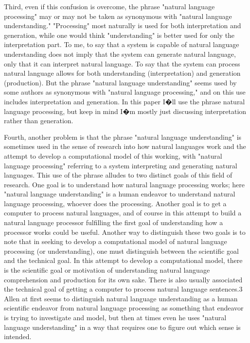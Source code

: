 Third, even if this confusion is overcome, the phrase "natural language processing" may or may not be taken as synonymous with "natural language understanding." "Processing" most naturally is used for both interpretation and generation, while one would think "understanding" is better used for only the interpretation part. To me, to say that a system is capable of natural language understanding does not imply that the system can generate natural language, only that it can interpret natural language. To say that the system can process natural language allows for both understanding (interpretation) and generation (production). But the phrase "natural language understanding" seems used by some authors as synonymous with "natural language processing," and on this use includes interpretation and generation. In this paper I�ll use the phrase natural language processing, but keep in mind I�m mostly just discussing interpretation rather than generation.

Fourth, another problem is that the phrase "natural language understanding" is sometimes used in the sense of research into how natural languages work and the attempt to develop a computational model of this working, with "natural language processing" referring to a system interpreting and generating natural languages. This use of the phrase alludes to two distinct goals of this field of research. One goal is to understand how natural language processing works; here "natural language understanding" is a human endeavor to understand natural language processing, whoever does the processing. Another goal is to get a computer to process natural languages, and of course in this attempt to build a natural language processor fulfilling the first goal of understanding how a processor works could be useful. Another way to distinguish these two goals is to note that in seeking to develop a computational model of natural language processing (or understanding), one must distinguish between the scientific goal and the technical goal. In this attempt to develop a computational model, there is the scientific goal or motivation of understanding natural language comprehension and production for its own sake. There is also usually associated the technical goal of getting a computer to process natural language sentences.3 Allen at first seems to distinguish natural language understanding as a human scientific endeavor from natural language processing as something that endeavor is trying to investigate and model, but then at times even he uses "natural language understanding" in a way that requires one to figure out which sense is intended.

